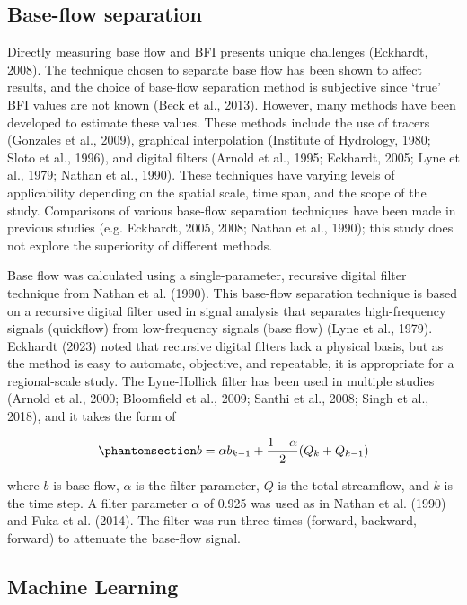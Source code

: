 \documentclass[
]{agujournal2019}
\begin{document}
\subsection{Base-flow separation}\label{sec-bf_sep}

Directly measuring base flow and BFI presents unique challenges
(Eckhardt, 2008). The technique chosen to separate base flow has been
shown to affect results, and the choice of base-flow separation method
is subjective since `true' BFI values are not known (Beck et al., 2013).
However, many methods have been developed to estimate these values.
These methods include the use of tracers (Gonzales et al., 2009),
graphical interpolation (Institute of Hydrology, 1980; Sloto et al.,
1996), and digital filters (Arnold et al., 1995; Eckhardt, 2005; Lyne et
al., 1979; Nathan et al., 1990). These techniques have varying levels of
applicability depending on the spatial scale, time span, and the scope
of the study. Comparisons of various base-flow separation techniques
have been made in previous studies (e.g. Eckhardt, 2005, 2008; Nathan et
al., 1990); this study does not explore the superiority of different
methods.

Base flow was calculated using a single-parameter, recursive digital
filter technique from Nathan et al. (1990). This base-flow separation
technique is based on a recursive digital filter used in signal analysis
that separates high-frequency signals (quickflow) from low-frequency
signals (base flow) (Lyne et al., 1979). Eckhardt (2023) noted that
recursive digital filters lack a physical basis, but as the method is
easy to automate, objective, and repeatable, it is appropriate for a
regional-scale study. The Lyne-Hollick filter has been used in multiple
studies (Arnold et al., 2000; Bloomfield et al., 2009; Santhi et al.,
2008; Singh et al., 2018), and it takes the form of

\begin{equation}\phantomsection\label{eq-bf-separate}{
b = \alpha b_{k-1} + \frac{1-\alpha}{2}(Q_k + Q_{k-1})
}\end{equation}

where \(b\) is base flow, \(\alpha\) is the filter parameter, \(Q\) is
the total streamflow, and \(k\) is the time step. A filter parameter
\(\alpha\) of 0.925 was used as in Nathan et al. (1990) and Fuka et al.
(2014). The filter was run three times (forward, backward, forward) to
attenuate the base-flow signal.

\subsection{Machine Learning}\label{machine-learning}
\end{document}
